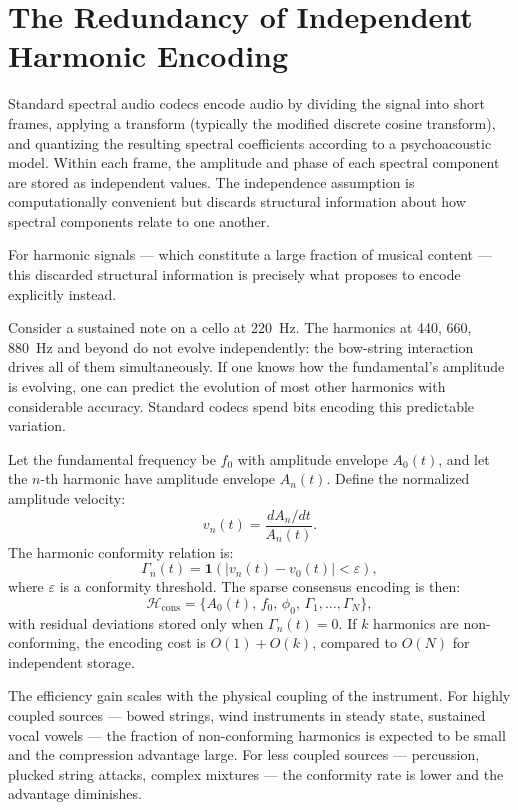 \section{The Redundancy of Independent Harmonic Encoding}
\label{sec:harmonic-redundancy}

Standard spectral audio codecs encode audio by dividing the signal
into short frames, applying a transform (typically the modified
discrete cosine transform), and quantizing the resulting spectral
coefficients according to a psychoacoustic model. Within each frame,
the amplitude and phase of each spectral component are stored as
independent values. The independence assumption is computationally
convenient but discards structural information about how spectral
components relate to one another.

For harmonic signals --- which constitute a large fraction of
musical content --- this discarded structural information is
precisely what \HCFone{} proposes to encode explicitly instead.

Consider a sustained note on a cello at 220~Hz. The harmonics at
440, 660, 880~Hz and beyond do not evolve independently: the
bow-string interaction drives all of them simultaneously. If one
knows how the fundamental's amplitude is evolving, one can predict
the evolution of most other harmonics with considerable accuracy.
Standard codecs spend bits encoding this predictable variation.

\begin{technote}
Let the fundamental frequency be $f_0$ with amplitude envelope
$A_0(t)$, and let the $n$-th harmonic have amplitude envelope
$A_n(t)$. Define the normalized amplitude velocity:
\[
  v_n(t) = \frac{dA_n/dt}{A_n(t)}.
\]
The harmonic conformity relation is:
\[
  \Gamma_n(t) = \mathbf{1}\!\left(|v_n(t) - v_0(t)| < \varepsilon\right),
\]
where $\varepsilon$ is a conformity threshold. The sparse consensus
encoding is then:
\[
  \mathcal{H}_{\mathrm{cons}}
  = \bigl\{A_0(t),\, f_0,\, \phi_0,\,
    \Gamma_1, \ldots, \Gamma_N\bigr\},
\]
with residual deviations stored only when $\Gamma_n(t) = 0$.
If $k$ harmonics are non-conforming, the encoding cost is
$O(1) + O(k)$, compared to $O(N)$ for independent storage.
\end{technote}

The efficiency gain scales with the physical coupling of the
instrument. For highly coupled sources --- bowed strings, wind
instruments in steady state, sustained vocal vowels --- the
fraction of non-conforming harmonics is expected to be small
and the compression advantage large. For less coupled sources
--- percussion, plucked string attacks, complex mixtures ---
the conformity rate is lower and the advantage diminishes.


